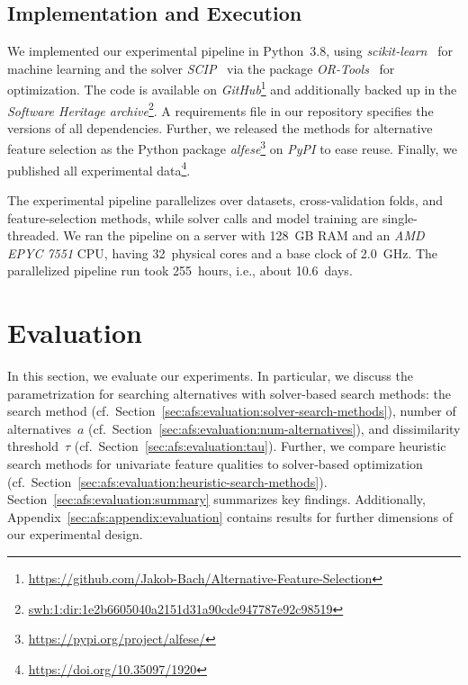 \documentclass{article}
\theoremstyle{definition}
\begin{document}
\subsection{Implementation and Execution}
\label{sec:afs:experimental-design:implementation}

We implemented our experimental pipeline in Python~3.8, using \emph{scikit-learn}~\cite{pedregosa2011scikit-learn} for machine learning and the solver \emph{SCIP}~\cite{bestuzheva2021scip} via the package \emph{OR-Tools}~\cite{perron2022or-tools} for optimization.
The code is available on \emph{GitHub}\footnote{\url{https://github.com/Jakob-Bach/Alternative-Feature-Selection}} and additionally backed up in the \emph{Software Heritage archive}\footnote{\href{https://archive.softwareheritage.org/swh:1:dir:1e2b6605040a2151d31a90cde947787e92c98519;origin=https://github.com/Jakob-Bach/Alternative-Feature-Selection;visit=swh:1:snp:1413d85e1a9005d5681ee7dbeae0b4df851780de;anchor=swh:1:rev:14dea32227848c06b1430b6371e100f3d8c74010}{swh:1:dir:1e2b6605040a2151d31a90cde947787e92c98519}}.
A requirements file in our repository specifies the versions of all dependencies.
Further, we released the methods for alternative feature selection as the Python package \emph{alfese}\footnote{\url{https://pypi.org/project/alfese/}} on \emph{PyPI} to ease reuse.
Finally, we published all experimental data\footnote{\url{https://doi.org/10.35097/1920}}.

The experimental pipeline parallelizes over datasets, cross-validation folds, and feature-selection methods, while solver calls and model training are single-threaded.
We ran the pipeline on a server with 128~GB RAM and an \emph{AMD EPYC 7551} CPU, having 32~physical cores and a base clock of 2.0~GHz.
The parallelized pipeline run took 255~hours, i.e., about 10.6~days.

\section{Evaluation}
\label{sec:afs:evaluation}

In this section, we evaluate our experiments.
In particular, we discuss the parametrization for searching alternatives with solver-based search methods: the search method (cf.~Section~\ref{sec:afs:evaluation:solver-search-methods}), number of alternatives~$a$ (cf.~Section~\ref{sec:afs:evaluation:num-alternatives}), and dissimilarity threshold~$\tau$ (cf.~Section~\ref{sec:afs:evaluation:tau}).
Further, we compare heuristic search methods for univariate feature qualities to solver-based optimization (cf.~Section~\ref{sec:afs:evaluation:heuristic-search-methods}).
Section~\ref{sec:afs:evaluation:summary} summarizes key findings.
Additionally, Appendix~\ref{sec:afs:appendix:evaluation} contains results for further dimensions of our experimental design.
\end{document}
